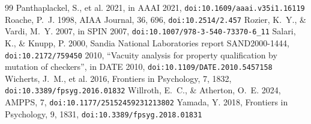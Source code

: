 \documentclass[11pt,a4paper]{article}
\begin{document}
\begin{thebibliography}{99}
 Panthaplackel, S., et al. 2021, in
  AAAI 2021, \texttt{doi:10.1609/aaai.v35i1.16119}
 Roache, P.~J. 1998, AIAA Journal, 36, 696,
  \texttt{doi:10.2514/2.457}
 Rozier, K.~Y., \& Vardi, M.~Y. 2007, in SPIN
  2007, \texttt{doi:10.1007/978-3-540-73370-6\_11}
 Salari, K., \& Knupp, P. 2000, Sandia National
  Laboratories report SAND2000-1444, \texttt{doi:10.2172/759450}
 2010, ``Vacuity analysis for property
  qualification by mutation of checkers'', in DATE 2010,
  \texttt{doi:10.1109/DATE.2010.5457158}
 Wicherts, J.~M., et al. 2016, Frontiers in
  Psychology, 7, 1832, \texttt{doi:10.3389/fpsyg.2016.01832}
 Willroth, E.~C., \& Atherton, O.~E.
  2024, AMPPS, 7, \texttt{doi:10.1177/25152459231213802}
 Yamada, Y. 2018, Frontiers in Psychology, 9, 1831,
  \texttt{doi:10.3389/fpsyg.2018.01831}
\end{thebibliography}
\end{document}
